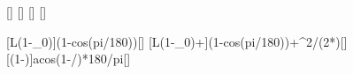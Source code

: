 [\mpss]
[\m]
[\degree]
[\mps]

[L\left(1-\cos\alpha_0\right)]{\LpX*(1-cos(\alpX*pi/180))}[\m]
[L\left(1-\cos\alpha_0\right)+]{\LpX*(1-cos(\alpX*pi/180))+\vnpX^2/(2*\gEX)}[\m]
[\arccos\left(1-\right)]{acos(1-\hpX/\LpX)*180/pi}[\degree]
